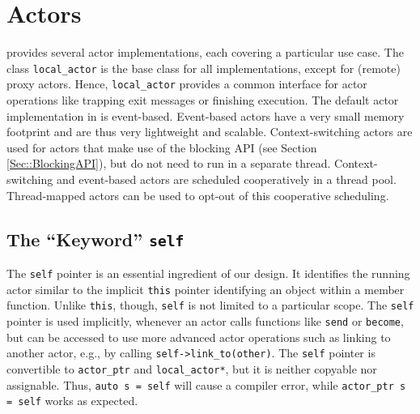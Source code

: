 \section{Actors}

\libcppa provides several actor implementations, each covering a particular use case.
The class \lstinline^local_actor^ is the base class for all implementations, except for (remote) proxy actors.
Hence, \lstinline^local_actor^ provides a common interface for actor operations like trapping exit messages or finishing execution.
The default actor implementation in \libcppa is event-based.
Event-based actors have a very small memory footprint and are thus very lightweight and scalable.
Context-switching actors are used for actors that make use of the blocking API (see Section \ref{Sec::BlockingAPI}), but do not need to run in a separate thread.
Context-switching and event-based actors are scheduled cooperatively in a thread pool.
Thread-mapped actors can be used to opt-out of this cooperative scheduling.



\subsection{The ``Keyword'' \texttt{self}}

The \lstinline^self^ pointer is an essential ingredient of our design.
It identifies the running actor similar to the implicit \lstinline^this^ pointer identifying an object within a member function.
Unlike \lstinline^this^, though, \lstinline^self^ is not limited to a particular scope.
The \lstinline^self^ pointer is used implicitly, whenever an actor calls functions like \lstinline^send^ or \lstinline^become^, but can be accessed to use more advanced actor operations such as linking to another actor, e.g., by calling \lstinline^self->link_to(other)^.
The \lstinline^self^ pointer is convertible to \lstinline^actor_ptr^ and \lstinline^local_actor*^, but it is neither copyable nor assignable.
Thus, \lstinline^auto s = self^ will cause a compiler error, while \lstinline^actor_ptr s = self^ works as expected.

